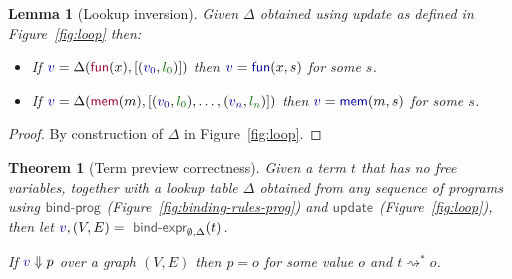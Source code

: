 \documentclass[acmsmall,anonymous,fleqn]{acmart}\settopmatter{printfolios=false,printccs=false,printacmref=false}
\newcounter{thc}
\theoremstyle{plain}
\newtheorem{lem}[thc]{Lemma}
\newtheorem{theorem}[thc]{Theorem}
\theoremstyle{definition}
\newcommand{\ident}[1]{\textnormal{\textcolor{idclr}{\sffamily #1}}}
\newcommand{\bndclr}[1]{\textcolor{kvdclr}{#1}}
\newcommand{\blblclr}[1]{\textcolor{numclr}{#1}}
\newcommand{\bnd}[1]{\textnormal{\textcolor{kvdclr}{\sffamily #1}}}
\newcommand{\bknd}[1]{\textnormal{\textcolor{prepclr}{\sffamily #1}}}
\begin{document}
\begin{lem}[Lookup inversion]
\label{thm:lemma-lookup}
Given $\Delta$ obtained using \ident{update} as defined in Figure~\ref{fig:loop} then:
\begin{itemize}
\raggedright
\item[--] If $\bndclr{v}=\Delta(\bknd{fun}(x),[(\bndclr{v_0}, \blblclr{l_0})])$
then $\bndclr{v}=\bnd{fun}(x, s)$ for some $s$.
\item[--] If $\bndclr{v}=\Delta(\bknd{mem}(m),[(\bndclr{v_0}, \blblclr{l_0}), \ldots, (\bndclr{v_n}, \blblclr{l_n})])$
then $\bndclr{v}=\bnd{mem}(m, s)$ for some $s$.
\end{itemize}
\end{lem}
\begin{proof}
By construction of $\Delta$ in Figure~\ref{fig:loop}.
\end{proof}

\begin{theorem}[Term preview correctness]
\label{thm:let-free-correct}
Given a term $t$ that has no free variables, together with a lookup table $\Delta$ obtained
from any sequence of programs using $\ident{bind-prog}$ (Figure~\ref{fig:binding-rules-prog}) and
$\ident{update}$ (Figure~\ref{fig:loop}), then
let $\bndclr{v}, (V, E) = \ident{bind-expr}_{\emptyset, \Delta}(t)$.

\vspace{0.25em}
\noindent
If $\bndclr{v}\Downarrow p$
over a graph $(V, E)$ then $p = o$ for some value $o$ and $t \rightsquigarrow^{*} o$.
\end{theorem}
\end{document}
